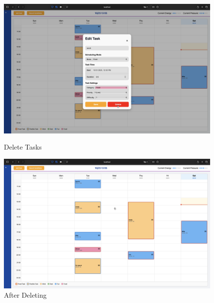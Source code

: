 \documentclass[12pt, a4paper]{article}
\begin{document}
\begin{enumerate}
                    \begin{figure}[H]
                        \begin{minipage}[t]{0.49\textwidth}
                            \centering
                            \includegraphics[width=\textwidth]{Images/System/timetable/delete.png}
                            \caption{Delete Tasks}
                            \label{delete}
                        \end{minipage}
                        \hfill
                        \begin{minipage}[t]{0.49\textwidth}
                            \centering
                            \includegraphics[width=\textwidth]{Images/System/timetable/aft_delete.png}
                            \caption{After Deleting}
                            \label{aft_delete}
                        \end{minipage}
                    \end{figure}


\end{enumerate}
\end{document}
